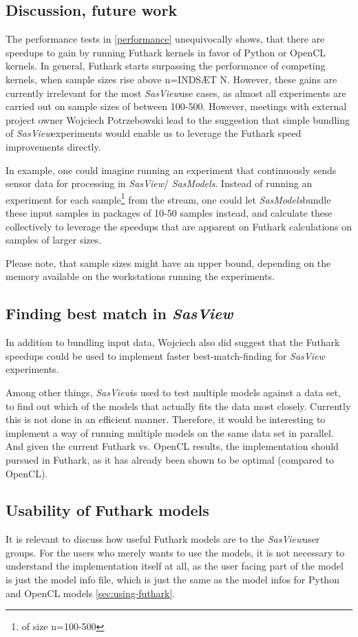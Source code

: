 \documentclass[11pt]{article}
\newcommand{\sasmodels}{\textit{SasModels}}
\newcommand{\sasview}{\textit{SasView}}
\begin{document}
\begin{mdframed}[
    frametitle={Why does Futhark perform faster than OpenCL?},
    nobreak=true]
\section{Discussion, future work}
\label{sec:discussion}
The performance tests in \ref{performance} unequivocally shows, that
there are speedups to gain by running Futhark kernels in favor of Python or
OpenCL kernels.
In general, Futhark starts surpassing the performance of competing kernels, when
sample sizes rise above n=INDSÆT N. However, these gains are currently
irrelevant for the most \sasview use cases, as almost all
experiments are carried out on sample sizes of between 100-500.
However, meetings with external project owner Wojciech Potrzebowski lead to the
suggestion that simple bundling of \sasview experiments would enable us
to leverage the Futhark speed improvements directly.

In example, one could imagine running an experiment that continuously sends
sensor data for processing in \sasview / \sasmodels.
Instead of running an experiment for each sample\footnote{of size n=100-500}
from the stream, one could let \sasmodels bundle these input samples in packages
of 10-50 samples
instead, and calculate these collectively to leverage the speedups that are
apparent on Futhark calculations on samples of larger sizes.

Please note, that sample sizes might have an upper bound, depending on the
memory available on the workstations running the experiments.

\subsection{Finding best match in \sasview}
\label{sec:best-match}
In addition to bundling input data, Wojciech also did suggest that the Futhark
speedups could be used to implement faster best-match-finding for \sasview
experiments.

Among other things, \sasview is used to test multiple models against a data set,
to find out which of the models that actually fits the data most closely.
Currently this is not done in an efficient manner.
Therefore, it would be interesting to implement a way of running multiple models
on the same data set in parallel.
And given the current Futhark vs. OpenCL results, the implementation should
pursued in Futhark, as it has already been shown to be optimal
(compared to OpenCL).


\subsection{Usability of Futhark models}
It is relevant to discuss how useful Futhark models are to the \sasview user
groups. For the users who merely wants to use the models, it is not necessary
to understand the implementation itself at all, as the user facing part of
the model is just the model info file, which is just the same as the model infos
for Python and OpenCL models \ref{sec:using-futhark}.


\end{mdframed}
\end{document}
